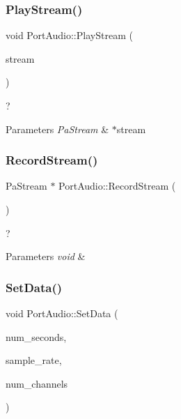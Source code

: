 \subsubsection{\texorpdfstring{Play\+Stream()}{PlayStream()}}
{\footnotesize\ttfamily void Port\+Audio\+::\+Play\+Stream (\begin{DoxyParamCaption}\item[{Pa\+Stream $\ast$}]{stream }\end{DoxyParamCaption})}



? 


\begin{DoxyParams}{Parameters}
{\em Pa\+Stream} & $\ast$stream \\
\hline
\end{DoxyParams}
\mbox{\label{class_port_audio_a0096f886eec6c33ae24b4610f9ee3fcb}} 
\subsubsection{\texorpdfstring{Record\+Stream()}{RecordStream()}}
{\footnotesize\ttfamily Pa\+Stream $\ast$ Port\+Audio\+::\+Record\+Stream (\begin{DoxyParamCaption}{ }\end{DoxyParamCaption})}



? 


\begin{DoxyParams}{Parameters}
{\em void} & \\
\hline
\end{DoxyParams}
\mbox{\label{class_port_audio_adbe0192928bae24d0d469b39561b9859}} 
\subsubsection{\texorpdfstring{Set\+Data()}{SetData()}}
{\footnotesize\ttfamily void Port\+Audio\+::\+Set\+Data (\begin{DoxyParamCaption}\item[{int}]{num\+\_\+seconds,  }\item[{int}]{sample\+\_\+rate,  }\item[{int}]{num\+\_\+channels }\end{DoxyParamCaption})}




